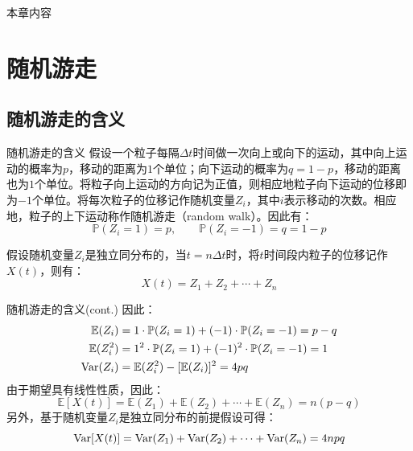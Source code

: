 \documentclass[t]{beamer}
\renewcommand{\Pr}{\mathbb{P}}
\newcommand{\E}{\mathbb{E}}
\newcommand{\Var}{{\rm Var}}
\begin{document}
\begin{frame}{本章内容}\small
\begin{spacing}{1.2}
  \begin{multicols}{2}
    \tableofcontents
  \end{multicols} 
\end{spacing} 
\end{frame}


\section{随机游走}

\subsection{随机游走的含义}


\begin{frame}{随机游走的含义}
  假设一个粒子每隔$\Delta t$时间做一次向上或向下的运动，其中向上运动的概率为$p$，移动的距离为$1$个单位；向下运动的概率为$q=1-p$，移动的距离也为$1$个单位。将粒子向上运动的方向记为正值，则相应地粒子向下运动的位移即为$-1$个单位。将每次粒子的位移记作随机变量$Z_i$，其中$i$表示移动的次数。相应地，粒子的上下运动称作随机游走（random walk）。因此有：
  \begin{equation*}
  \Pr(Z_i=1)=p,\qquad \Pr(Z_i=-1)=q=1-p
  \end{equation*}
  
  假设随机变量$Z_i$是独立同分布的，当$t=n\Delta t$时，将$t$时间段内粒子的位移记作$X(t)$，则有：
  \begin{equation*}
  X(t)=Z_1+Z_2+\cdots +Z_n
  \end{equation*}
\end{frame}


\begin{frame}{随机游走的含义(cont.)}
  因此：\[\begin{split}
    \E(Z_i)&=1 \cdot \Pr(Z_i=1)+(-1)\cdot \Pr(Z_i=-1)=p-q\\
    \E(Z_i^2)&=1^2 \cdot \Pr(Z_i=1)+(-1)^2\cdot \Pr(Z_i=-1)=1\\
    \Var(Z_i)&=\E(Z_i^2)-[\E(Z_i)]^2=4pq
    \end{split}
    \]
    由于期望具有线性性质，因此：
\begin{equation*}
\E[X(t)]=\E(Z_1)+\E(Z_2)+\cdots +\E(Z_n)=n(p-q)
\end{equation*}
另外，基于随机变量$Z_i$是独立同分布的前提假设可得：
\begin{equation*}
\Var[X(t)]=\Var(Z_1)+\Var(Z_2)+\cdots +\Var(Z_n)=4npq
\end{equation*}
\end{frame}
\end{document}
